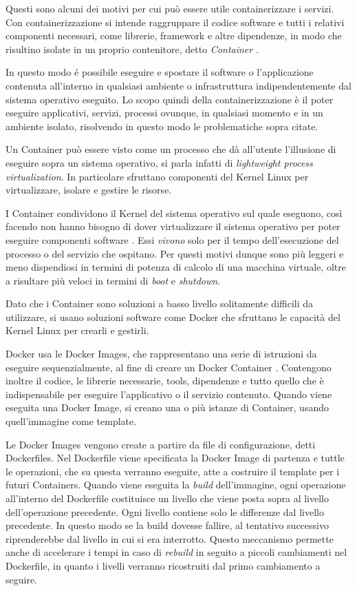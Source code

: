 Questi sono alcuni dei motivi per cui può essere utile containerizzare i servizi.
Con containerizzazione si intende raggruppare  il codice software e tutti i relativi componenti necessari, come librerie, framework e altre dipendenze, in modo che risultino isolate in un proprio contenitore, detto \emph{Container} .

In questo modo é possibile eseguire e spostare il software o l'applicazione contenuta all'interno in qualsiasi ambiente o infrastruttura indipendentemente dal sistema operativo eseguito.
Lo scopo quindi della containerizzazione è il poter eseguire applicativi, servizi, processi ovunque, in qualsiasi momento e in un ambiente isolato, risolvendo in questo modo le problematiche sopra citate.

Un Container può essere visto come un processo che dà all'utente l'illusione di eseguire sopra un sistema operativo, si parla infatti di \emph{lightweight process virtualization}. In particolare sfruttano componenti del Kernel Linux per virtualizzare, isolare e gestire le risorse.

I Container condividono il Kernel del sistema operativo sul quale eseguono, così facendo non hanno bisogno di dover virtualizzare il sistema operativo per poter eseguire componenti software \cite{mouat2015using}.  
Essi \textit{vivono} solo per il tempo dell'esecuzione del processo o del servizio che ospitano.
Per questi motivi dunque sono  più leggeri e  meno dispendiosi in termini di potenza di calcolo di una macchina virtuale, oltre a risultare più veloci in termini di \textit{boot} e \textit{shutdown}.

Dato che i Container sono soluzioni a basso livello solitamente difficili da utilizzare, si usano soluzioni software come Docker  \cite{docker}  che sfruttano le capacità del Kernel Linux per crearli e gestirli.

Docker usa le Docker Images, che rappresentano una serie di istruzioni da eseguire sequenzialmente, al fine di creare un Docker Container \cite{mouat2015using}. Contengono inoltre il codice, le librerie necessarie, tools, dipendenze e tutto quello che è indispensabile per eseguire l'applicativo o il servizio contenuto. Quando viene eseguita una Docker Image, si creano una o più istanze di Container, usando quell'immagine come template.


Le Docker Images vengono create a partire da file di configurazione, detti Dockerfiles. Nel Dockerfile viene specificata la Docker Image di partenza e tuttle le operazioni, che su questa verranno eseguite, atte a costruire il template per i futuri Containers. Quando viene eseguita la \textit{build} dell'immagine, ogni operazione all'interno del Dockerfile costituisce un livello che viene posta sopra al livello dell'operazione precedente. Ogni livello contiene solo le differenze dal livello precedente. In questo modo se la build dovesse fallire, al tentativo successivo riprenderebbe dal livello in cui si era interrotto. Questo meccanismo permette anche di accelerare i tempi in caso di \textit{rebuild} in seguito a piccoli cambiamenti nel Dockerfile, in quanto i livelli verranno ricostruiti dal primo cambiamento a seguire.

